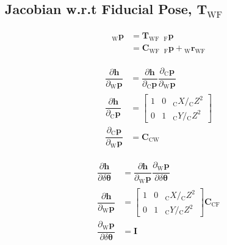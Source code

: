 \documentclass{article}
\renewcommand{\Vec}[1]{{\mathbf{#1}}}
\newcommand{\Mat}[1]{{\mathbf{#1}}}
\newcommand{\I}{{\Mat{I}}}
\newcommand{\tf}{\mathbf{T}}
\newcommand{\cam}{{\text{C}}}
\newcommand{\world}{{\text{W}}}
\newcommand{\fiducial}{{\text{F}}}
\newcommand{\KineNotationTransform}[3]{{{#1}_{#2#3}}}
\newcommand{\KineNotation}[3]{{{{}_{#2}} {#1}_{#2#3}}}
\newcommand{\KineNotationPart}[3]{{{{}_{#2}} {#1}_{#3}}}
\newcommand{\KineNotationBare}[2]{{{{}_{#2}} {#1}}}
\newcommand{\trans}{{\Vec{r}}}
\newcommand{\Trans}[2]{{\KineNotation{\trans}{#1}{#2}}}
\newcommand{\rot}{{\Mat{C}}}
\newcommand{\Rot}[2]{{\KineNotationTransform{\rot}{#1}{#2}}}
\newcommand{\tf}{{\Mat{T}}}
\newcommand{\Tf}[2]{{\KineNotationTransform{\tf}{#1}{#2}}}
\newcommand{\point}{\Vec{p}}
\newcommand{\Pt}[1]{{\KineNotationPart{\point}{#1}{}}}
\newcommand{\Point}[2]{{\KineNotationBare{\point}{#1}}}
\newcommand{\projFunc}{{\Vec{h}}}
\begin{document}
\subsection{Jacobian w.r.t Fiducial Pose, $\Tf{\world}{\fiducial}$}

\begin{align}
\begin{split}
  \Point{\world}{\fiducial_{ij}}
  &= \Tf{\world}{\fiducial}
     \enspace
     \Point{\fiducial}{\fiducial_{ij}} \\
  &= \Rot{\world}{\fiducial}
     \enspace
     \Point{\fiducial}{\fiducial_{ij}}
     + \Trans{\world}{\fiducial}
\end{split}
\end{align}

\begin{align}
  \dfrac{\partial{\projFunc}}{\partial{\Pt{\world}}}
  &=
  \dfrac{\partial{\projFunc}}{\partial{\Pt{\cam}}}
  \dfrac{\partial{\Pt{\cam}}}{\partial{\Pt{\world}}} \\
  \dfrac{\partial{\projFunc}}{\partial{\Pt{\cam}}}
  &=
  \begin{bmatrix}
    1 & 0 & \KineNotationBare{X}{\cam} / \KineNotationBare{Z}{\cam}^{2} \\
    0 & 1 & \KineNotationBare{Y}{\cam} / \KineNotationBare{Z}{\cam}^{2}
  \end{bmatrix} \\
  \dfrac{\partial{\Pt{\cam}}}{\partial{\Pt{\world}}}
  &=
  \Rot{\cam}{\world}
\end{align}

\begin{align}
  \dfrac{\partial{\projFunc}}{\partial{\delta\Vec{\theta}}}
  &=
  \dfrac{\partial{\projFunc}}{\partial{\Pt{\world}}}
  \dfrac{\partial{\Pt{\world}}}{\partial{\delta\Vec{\theta}}} \\
  \dfrac{\partial{\projFunc}}{\partial{\Pt{\world}}}
  &=
  \begin{bmatrix}
    1 & 0 & \KineNotationBare{X}{\cam} / \KineNotationBare{Z}{\cam}^{2} \\
    0 & 1 & \KineNotationBare{Y}{\cam} / \KineNotationBare{Z}{\cam}^{2}
  \end{bmatrix}
  \Rot{\cam}{\fiducial} \\
  \dfrac{\partial{\Pt{\world}}}{\partial{\delta\Vec{\theta}}}
  &= \I
\end{align}
\end{document}
